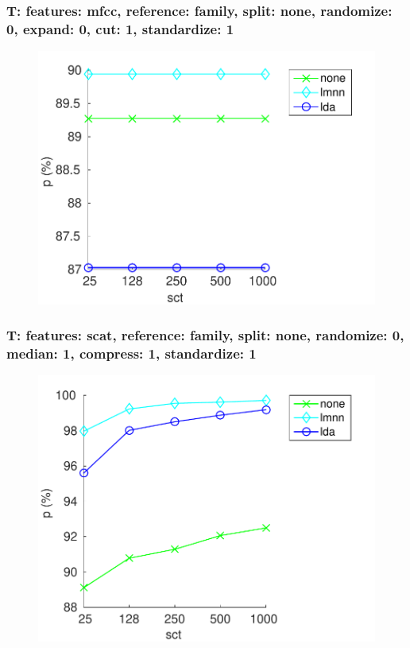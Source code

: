 \documentclass{beamer}
\begin{document}
\begin{frame}\frametitle{\small T: features: mfcc, reference: family, split: none, randomize: 0, expand: 0, cut: 1, standardize: 1}
\begin{center}
\begin{figure}
\centering
\includegraphics[width=\textwidth,height=0.8\textheight,keepaspectratio]{./figures/Fig143.pdf}
\label{femfRefaSpnoRa0Ex0Cu1St1}
\end{figure}
\end{center}


\end{frame}

\begin{frame}\frametitle{\small T: features: scat, reference: family, split: none, randomize: 0, median: 1, compress: 1, standardize: 1}
\begin{center}
\begin{figure}
\centering
\includegraphics[width=\textwidth,height=0.8\textheight,keepaspectratio]{./figures/Fig144.pdf}
\label{fescRefaSpnoRa0Me1Co1St1}
\end{figure}
\end{center}


\end{frame}
\end{document}
